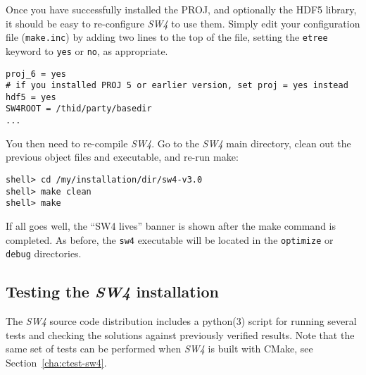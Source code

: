 \documentclass[11pt]{article}
\begin{document}
Once you have successfully installed the PROJ, and optionally the HDF5 library, it should be easy to re-configure \emph{SW4} to use them. Simply edit your configuration file (\verb+make.inc+) by adding two lines to the top of the file, setting the {\tt etree} keyword to
{\tt yes} or {\tt no}, as appropriate.
\begin{verbatim}
proj_6 = yes 
# if you installed PROJ 5 or earlier version, set proj = yes instead
hdf5 = yes
SW4ROOT = /thid/party/basedir
...
\end{verbatim}
You then need to re-compile \emph{SW4}. Go to the \emph{SW4} main directory, clean out the previous
object files and executable, and re-run make:
\begin{verbatim}
shell> cd /my/installation/dir/sw4-v3.0
shell> make clean
shell> make
\end{verbatim}
If all goes well, the ``SW4 lives'' banner is shown after the make command is
completed. As before, the \verb+sw4+ executable will be located in the \verb+optimize+ or
\verb+debug+ directories.

\subsection{Testing the \emph{SW4} installation}
The \emph{SW4} source code distribution includes a python(3) script for running several tests and
checking the solutions against previously verified results. Note that the same set of tests can be
performed when \emph{SW4} is built with CMake, see Section~\ref{cha:ctest-sw4}.
\end{document}
